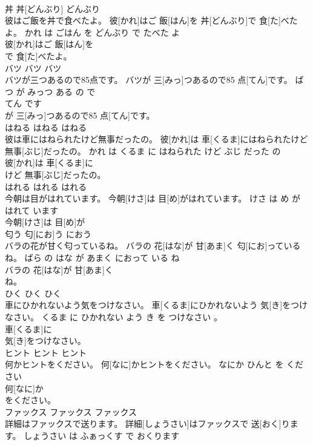 \documentclass[8pt]{extreport}
\begin{document}
\begin{CJK}{UTF8}{min}
\\	丼	丼[どんぶり]	どんぶり	
\\	彼はご飯を丼で食べたよ。	彼[かれ]はご 飯[はん]を 丼[どんぶり]で 食[た]べたよ。	かれ は ごはん を どんぶり で たべた よ	
\\	彼[かれ]はご 飯[はん]を
\\	で 食[た]べたよ。			
\\	バツ	バツ	バツ	
\\	バツが三つあるので85点です。	バツが 三[みっ]つあるので85 点[てん]です。	ばつ が みっつ ある の で 
\\	てん です	
\\	が 三[みっ]つあるので85 点[てん]です。			
\\	はねる	はねる	はねる	
\\	彼は車にはねられたけど無事だったの。	彼[かれ]は 車[くるま]にはねられたけど 無事[ぶじ]だったの。	かれ は くるま に はねられた けど ぶじ だった の	
\\	彼[かれ]は 車[くるま]に
\\	けど 無事[ぶじ]だったの。			
\\	はれる	はれる	はれる	
\\	今朝は目がはれています。	今朝[けさ]は 目[め]がはれています。	けさ は め が はれて います	
\\	今朝[けさ]は 目[め]が
\\	匂う	匂[にお]う	におう	
\\	バラの花が甘く匂っているね。	バラの 花[はな]が 甘[あま]く 匂[にお]っているね。	ばら の はな が あまく におって いる ね	
\\	バラの 花[はな]が 甘[あま]く
\\	ね。			
\\	ひく	ひく	ひく	
\\	車にひかれないよう気をつけなさい。	車[くるま]にひかれないよう 気[き]をつけなさい。	くるま に ひかれない よう き を つけなさい 。	
\\	車[くるま]に
\\	気[き]をつけなさい。			
\\	ヒント	ヒント	ヒント	
\\	何かヒントをください。	何[なに]かヒントをください。	なにか ひんと を ください	
\\	何[なに]か
\\	をください。			
\\	ファックス	ファックス	ファックス	
\\	詳細はファックスで送ります。	詳細[しょうさい]はファックスで 送[おく]ります。	しょうさい は ふぁっくす で おくります	

\end{CJK}
\end{document}
